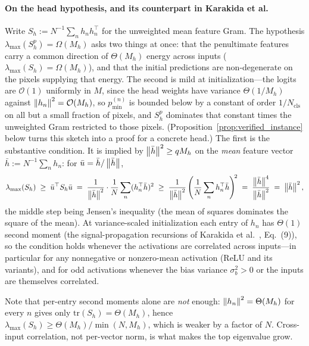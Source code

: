 \paragraph{On the head hypothesis, and its counterpart in
Karakida et al.}
Write $S_h := N^{-1} \sum_n h_n h_n^\top$ for the unweighted mean
feature Gram. The hypothesis
$\lambda_{\max}(S_h^{p}) = \Omega(M_h)$ asks two
things at once: that the penultimate features carry a common
direction of $\Theta(M_h)$ energy across inputs
($\lambda_{\max}(S_h) = \Omega(M_h)$), and that the
initial predictions are non-degenerate on the pixels supplying that
energy. The second is mild at initialization---the logits are
$\mathcal{O}(1)$ uniformly in $M$, since the head weights have
variance $\Theta(1/M_h)$ against $\left\lVert h_n\right\rVert^2 = \mathcal{O}(M_h)$,
so $p^{(n)}_{\min}$ is bounded below by a constant of order
$1/N_{\mathrm{cls}}$ on all but a small fraction of pixels, and $S_h^{p}$
dominates that constant times the unweighted Gram restricted to
those pixels. (Proposition~\ref{prop:verified_instance} below turns
this sketch into a proof for a concrete head.) The first is the
substantive condition. It is
implied by $\left\lVert\bar{h}\right\rVert^2 \geq q M_h$ on the \emph{mean} feature
vector $\bar{h} := N^{-1}\sum_n h_n$: for $\bar{u} =
\bar{h}/\left\lVert\bar{h}\right\rVert$,
\[
    \lambda_{\max}(S_h)
    \;\geq\; \bar{u}^\top S_h \bar{u}
    \;=\; \frac{1}{\left\lVert\bar{h}\right\rVert^2} \cdot
        \frac{1}{N}\sum_n (h_n^\top \bar{h})^2
    \;\geq\; \frac{1}{\left\lVert\bar{h}\right\rVert^2}
        \left( \frac{1}{N}\sum_n h_n^\top \bar{h} \right)^{\!2}
    \;=\; \frac{\left\lVert\bar{h}\right\rVert^4}{\left\lVert\bar{h}\right\rVert^2}
    \;=\; \left\lVert\bar{h}\right\rVert^2,
\]
the middle step being Jensen's inequality (the mean of squares
dominates the square of the mean). At variance-scaled initialization each entry of
$h_n$ has $\Theta(1)$ second moment (the signal-propagation
recursions of Karakida et al.~\cite{karakida2019universal}, Eq.~(9)),
so the condition holds whenever the activations are correlated across
inputs---in particular for any nonnegative or nonzero-mean
activation (ReLU and its variants), and for odd activations whenever
the bias variance $\sigma_b^2 > 0$ or the inputs are themselves
correlated.

Note that per-entry second moments alone are \emph{not} enough:
$\left\lVert h_n\right\rVert^2 = \Theta(M_h)$ for every $n$ gives only
$\mathrm{tr}(S_h) = \Theta(M_h)$, hence
$\lambda_{\max}(S_h) \geq \Theta(M_h)/\min(N, M_h)$, which is weaker
by a factor of $N$. Cross-input correlation, not per-vector norm, is
what makes the top eigenvalue grow.

